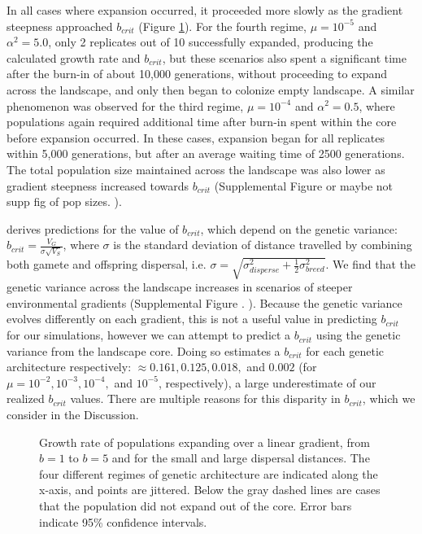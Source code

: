 In all cases where expansion occurred, it proceeded more slowly as the gradient steepness approached $b_{crit}$ (Figure \ref{fig:linearspeed}). For the fourth regime, $\mu = 10^{-5}$ and $\alpha^2 = 5.0$, only 2 replicates out of 10 successfully expanded, producing the calculated growth rate and $b_{crit}$, but these scenarios also spent a significant time after the burn-in of \color{red}about 10,000 \color{black} generations, without proceeding to expand across the landscape, and only then began to colonize empty landscape. A similar phenomenon was observed for the third regime, $\mu = 10^{-4}$ and $\alpha^2 = 0.5$, where populations again required additional time after burn-in spent within the core before expansion occurred. In these cases, expansion began for all replicates within \color{red}5,000 \color{black} generations, but after an average waiting time of \color{red}2500 \color{black} generations. The total population size maintained across the landscape was also lower as gradient steepness increased towards $b_{crit}$ (\color{red}Supplemental Figure or maybe not supp fig of pop sizes.\color{black} ). 

\citet{Barton:2001} derives predictions for the value of $b_{crit}$, which depend on the genetic variance: $b_{crit} = \frac{V_G}{\sigma \sqrt{V_S}}$, where $\sigma$ is the standard deviation of distance travelled by combining both gamete and offspring dispersal, i.e. $\sigma = \sqrt{\sigma_{disperse}^2 + \frac{1}{2}\sigma_{breed}^2}$. We find that the genetic variance across the landscape increases in scenarios of steeper environmental gradients (Supplemental Figure . ). Because the genetic variance evolves differently on each gradient, this is not a useful value in predicting $b_{crit}$ for our simulations, however we can attempt to predict a $b_{crit}$ using the genetic variance from the landscape core. Doing so estimates a $b_{crit}$ for each genetic architecture respectively: $\approx 0.161, 0.125, 0.018,$ and $0.002$ (for $\mu = 10^{-2}, 10^{-3}, 10^{-4},$ and $10^{-5}$, respectively), a large underestimate of our realized $b_{crit}$ values. There are multiple reasons for this disparity in $b_{crit}$, which we consider in the Discussion.

\begin{figure}[h]
\centering
{}
\caption[Growth rate of populations expanding over a linear gradient.]{Growth rate of populations expanding over a linear gradient, from $b = 1$ to $b = 5$ and for the small and large dispersal distances. The four different regimes of genetic architecture are indicated along the x-axis, and points are jittered. Below the gray dashed lines are cases that the population did not expand out of the core. Error bars indicate 95\% confidence intervals.}
\label{fig:linearspeed}
\end{figure}

